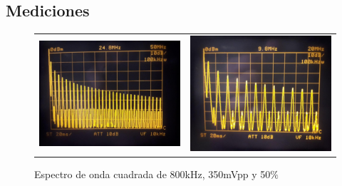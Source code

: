 \subsection{Mediciones}

\begin{figure}[H]
    \centering
    \begin{tabular}{c c}
        \includegraphics[scale=0.19]{../Mediciones/Ejercicio_2/ej2_cuadrada_50.jpeg} &
        \includegraphics[scale=0.175]{../Mediciones/Ejercicio_2/ej2_cuadrada_50_zoom.jpeg}
    \end{tabular}
    \caption{Espectro de onda cuadrada de 800kHz, 350mVpp y 50$\%$}
    \label{ej2_cuadrada_50}
\end{figure}

